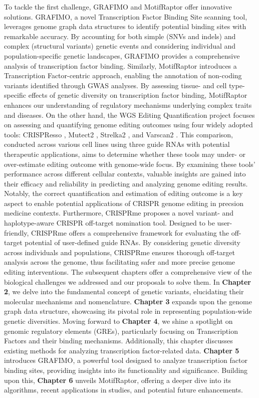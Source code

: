 \documentclass[a4paper, titlepage, openright]{book}
\newcommand{\grafimo}{GRAFIMO\xspace}
\newcommand{\crisprme}{CRISPRme\xspace}
\newcommand{\motifraptor}{MotifRaptor\xspace}
\begin{document}
%
To tackle the first challenge, \grafimo \citep{tognon2021grafimo} and \motifraptor \citep{yao2021motif} offer innovative solutions. \grafimo, a novel Transcription Factor Binding Site scanning tool, leverages genome graph data structures to identify potential binding sites with remarkable accuracy. By accounting for both simple (SNVs and indels) and complex (structural variants) genetic events and considering individual and population-specific genetic landscapes, \grafimo provides a comprehensive analysis of transcription factor binding. Similarly, \motifraptor introduces a Transcription Factor-centric approach, enabling the annotation of non-coding variants identified through GWAS analyses. By assessing tissue- and cell type-specific effects of genetic diversity on transcription factor binding, \motifraptor enhances our understanding of regulatory mechanisms underlying complex traits and diseases. On the other hand, the WGS Editing Quantification project focuses on assessing and quantifying genome editing outcomes using four widely adopted tools: CRISPResso \citep{clement2019crispresso2}, Mutect2 \citep{mckenna2010genome}, Strelka2 \citep{kim2018strelka2}, and Varscan2 \citep{koboldt2012varscan}. This comparison, conducted across various cell lines using three guide RNAs with potential therapeutic applications, aims to determine whether these tools may under- or over-estimate editing outcome with genome-wide focus. By examining these tools' performance across different cellular contexts, valuable insights are gained into their efficacy and reliability in predicting and analyzing genome editing results. Notably, the correct quantification and estimation of editing outcome is a key aspect to enable potential applications of CRISPR genome editing in precsion medicine contexts. Furthermore, \crisprme \citep{cancellieri2023human} proposes a novel variant- and haplotype-aware CRISPR off-target nomination tool. Designed to be user-friendly, \crisprme offers a comprehensive framework for evaluating the off-target potential of user-defined guide RNAs. By considering genetic diversity across individuals and populations, \crisprme ensures thorough off-target analysis across the genome, thus facilitating safer and more precise genome editing interventions. The subsequent chapters offer a comprehensive view of the biological challenges we addressed and our proposals to solve them. In \textbf{Chapter 2}, we delve into the fundamental concept of genetic variants, elucidating their molecular mechanisms and nomenclature. \textbf{Chapter 3} expands upon the genome graph data structure, showcasing its pivotal role in representing population-wide genetic diversities. Moving forward to \textbf{Chapter 4}, we shine a spotlight on genomic regulatory elements (GREs), particularly focusing on Transcription Factors and their binding mechanisms. Additionally, this chapter discusses existing methods for analyzing transcription factor-related data. \textbf{Chapter 5} introduces \grafimo, a powerful tool designed to analyze transcription factor binding sites, providing insights into its functionality and significance. Building upon this, \textbf{Chapter 6} unveils \motifraptor, offering a deeper dive into its algorithms, recent applications in studies, and potential future enhancements. 
\end{document}
